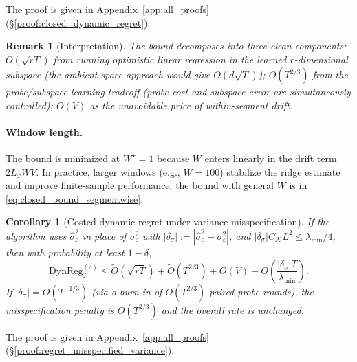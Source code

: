 \documentclass{article}
\newcommand{\DynReg}{\mathrm{DynReg}}
\newtheorem{corollary}{Corollary}
\newtheorem{remark}{Remark}
\begin{document}
The proof is given in Appendix~\ref{app:all_proofs} (\S\ref{proof:closed_dynamic_regret}).

\begin{remark}[Interpretation]
The bound decomposes into three clean components:
$\widetilde O(\sqrt{rT})$ from running optimistic linear regression in the learned $r$-dimensional subspace (the ambient-space approach would give $\widetilde O(d\sqrt{T})$);
$\widetilde O(T^{2/3})$ from the probe/subspace-learning tradeoff (probe cost and subspace error are simultaneously controlled);
$O(V)$ as the unavoidable price of within-segment drift.
\end{remark}

\paragraph{Window length.}
The bound is minimized at $W^\star = 1$ because $W$ enters linearly in the drift term $2L_x W V$. In practice, larger windows (e.g., $W = 100$) stabilize the ridge estimate and improve finite-sample performance; the bound with general $W$ is in \eqref{eq:closed_bound_segmentwise}.

\begin{corollary}[Costed dynamic regret under variance misspecification]
\label{cor:regret_misspecified_variance}
If the algorithm uses $\hat\sigma_\varepsilon^2$ in place of $\sigma_\varepsilon^2$ with $|\delta_\sigma| := |\hat\sigma_\varepsilon^2 - \sigma_\varepsilon^2|$, and $|\delta_\sigma|C_{\mathcal K}L^2 \le \lambda_{\min}/4$, then with probability at least $1-\delta$,
\[
\DynReg_T^{(c)} \le \widetilde O(\sqrt{rT}) + \widetilde O(T^{2/3}) + O(V) + O\!\left(\frac{|\delta_\sigma|T}{\lambda_{\min}}\right).
\]
If $|\delta_\sigma| = O(T^{-1/3})$ (via a burn-in of $O(T^{2/3})$ paired probe rounds), the misspecification penalty is $O(T^{2/3})$ and the overall rate is unchanged.
\end{corollary}

The proof is given in Appendix~\ref{app:all_proofs} (\S\ref{proof:regret_misspecified_variance}).
\end{document}
